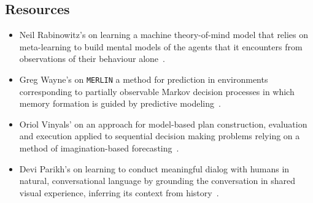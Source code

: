 
\subsection{Resources}

\begin{itemize}
%
\item Neil Rabinowitz's {} on learning a machine theory-of-mind model that relies on meta-learning to build mental models of the agents that it encounters from observations of their behaviour alone~\cite{RabinowitzetalCoRR-18}.
%
\item Greg Wayne's {} on {\tt{MERLIN}} a method for prediction in environments corresponding to partially observable Markov decision processes in which memory formation is guided by predictive modeling~\cite{WayneetalCoRR-18}.
%
\item Oriol Vinyals' {} on an approach for model-based plan construction, evaluation and execution applied to sequential decision making problems relying on a method of imagination-based forecasting~\cite{PascanuetalCoRR-17}.
%
\item Devi Parikh's {} on learning to conduct meaningful dialog with humans in natural, conversational language by grounding the conversation in shared visual experience, inferring its context from history~\cite{DasetalCVPR-17}.
%
\end{itemize}

